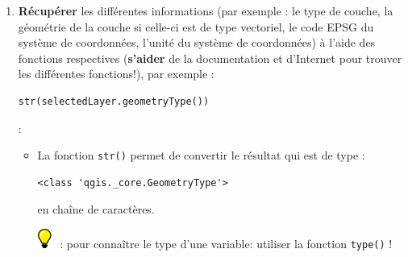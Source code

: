 \documentclass[11pt]{article}
\begin{document}
\begin{enumerate}
\item \textbf{Récupérer} les différentes informations (par exemple : le type de couche, la géométrie de la couche si celle-ci est de type vectoriel, le code EPSG du système de coordonnées, l'unité du système de coordonnées) à l'aide des fonctions respectives (\textbf{s'aider} de la documentation et d'Internet pour trouver les différentes fonctions!), par exemple : 
\vspace*{-0.8em}
\begin{center}
\begin{minipage}[t]{0.40\textwidth}
\begin{verbatim}
str(selectedLayer.geometryType())
\end{verbatim}
\end{minipage}
\end{center}
\vspace*{0.4em}



\underline{}: 
\vspace*{0.4em}
\begin{itemize}\itemsep0.2em
\renewcommand\labelitemi{\---}
\item La fonction \og{}\texttt{str()}\fg{} permet de convertir le résultat qui est de type :
\vspace*{-0.2em}
\begin{center}
\begin{minipage}[t]{0.40\textwidth}
\begin{verbatim}
<class 'qgis._core.GeometryType'>
\end{verbatim}
\end{minipage}
\end{center}
\vspace*{1em}

en chaîne de caractères. \vspace*{0.2em}

\includegraphics[scale=1]{tip_l.png} \underline{}: pour connaître le type d'une variable: utiliser la fonction  \og{}\texttt{type()}\fg{} !







\end{itemize}
\end{enumerate}
\end{document}
